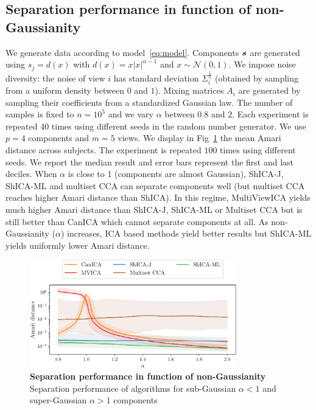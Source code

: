 \subsection{Separation performance in function of non-Gaussianity}
We generate data according to model~\eqref{eq:model}. Components $\boldsymbol{s}$ are
generated using $s_j = d(x)$ with $d(x) = x |x|^{\alpha - 1}$ and $x \sim
\mathcal{N}(0, 1)$. We impose noise diversity: the noise of view $i$ has standard deviation $\Sigma_i^{\frac12}$ (obtained by sampling from a uniform density between $0$ and $1$).
Mixing matrices $A_i$ are generated by sampling their coefficients from a standardized Gaussian law. The number of samples is fixed to $n=10^5$ and we vary $\alpha$ between $0.8$ and $2$. Each experiment is repeated 40 times using different seeds in the random number generator. We use $p=4$ components and $m=5$ views. We display in Fig~\ref{exp:separatingpower} the mean Amari distance across subjects. The experiment is repeated $100$ times using different seeds. We report the median result and error bars  represent the first and last deciles.
 When $\alpha$ is close to 1 (components are almost Gaussian), ShICA-J, ShICA-ML and multiset CCA can separate components well (but multiset CCA reaches higher Amari distance than ShICA). In this regime, MultiViewICA yields much higher Amari distance than ShICA-J, ShICA-ML or Multiset CCA but is still better than CanICA which cannot separate components at all.
 As non-Gaussianity ($\alpha$) increases, ICA based methods yield better results but ShICA-ML yields uniformly lower Amari distance.
\begin{figure}
\centering
  \includegraphics[width=0.8\textwidth]{./figures/amvica/synthetic_Gaussian_source.pdf}
  \caption{\textbf{ Separation performance in function of non-Gaussianity} Separation performance of algorithms for sub-Gaussian $\alpha < 1$ and super-Gaussian $\alpha > 1$ components}
  \label{exp:separatingpower}
\end{figure}

